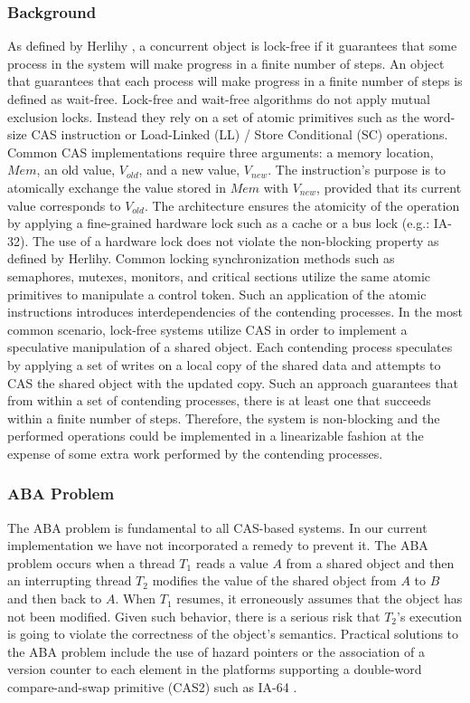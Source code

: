 \subsubsection{Background}

As defined by Herlihy \cite{Herlihy1993}, a concurrent object is
lock-free if it guarantees that some process in the system will make
progress in a finite number of steps. An object that guarantees that
each process will make progress in a finite number of steps is defined
as wait-free. Lock-free and wait-free algorithms do not apply mutual
exclusion locks. Instead they rely on a set of atomic primitives such
as the word-size CAS instruction or Load-Linked (LL) / Store
Conditional (SC) operations. Common CAS implementations require three
arguments: a memory location, $Mem$, an old value, $V_{old}$, and a
new value, $V_{new}$. The instruction's purpose is to atomically
exchange the value stored in $Mem$ with $V_{new}$, provided that its
current value corresponds to $V_{old}$. The architecture ensures the
atomicity of the operation by applying a fine-grained hardware lock
such as a cache or a bus lock (e.g.: IA-32). The use of a hardware
lock does not violate the non-blocking property as defined by
Herlihy. Common locking synchronization methods such as semaphores,
mutexes, monitors, and critical sections utilize the same atomic
primitives to manipulate a control token. Such an application of the
atomic instructions introduces interdependencies of the contending
processes. In the most common scenario, lock-free systems utilize CAS
in order to implement a speculative manipulation of a shared
object. Each contending process speculates by applying a set of writes
on a local copy of the shared data and attempts to CAS the shared
object with the updated copy. Such an approach guarantees that from
within a set of contending processes, there is at least one that
succeeds within a finite number of steps. Therefore, the system is
non-blocking and the performed operations could be implemented in a
linearizable fashion at the expense of some extra work performed by
the contending processes.

\subsubsection{ABA Problem}

The ABA problem is fundamental to all CAS-based systems. In our
current implementation we have not incorporated a remedy to prevent
it. The ABA problem occurs when a thread $T_1$ reads a value $A$ from
a shared object and then an interrupting thread $T_2$ modifies the
value of the shared object from $A$ to $B$ and then back to $A$. When
$T_1$ resumes, it erroneously assumes that the object has not been
modified. Given such behavior, there is a serious risk that $T_2$'s
execution is going to violate the correctness of the object's
semantics. Practical solutions to the ABA problem include the use of
hazard pointers \cite{Michael2004} or the association of a version
counter to each element in the platforms supporting a double-word
compare-and-swap primitive (CAS2) such as IA-64 \cite{Intel2010}.


